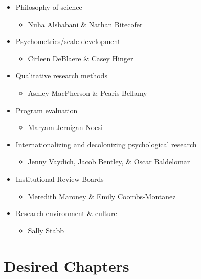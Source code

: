 \documentclass[
  11pt,
]{book}
\providecommand{\tightlist}{%
  \setlength{\itemsep}{0pt}\setlength{\parskip}{0pt}}
\begin{document}
\begin{itemize}
\tightlist
\item
  Philosophy of science

  \begin{itemize}
  \tightlist
  \item
    Nuha Alshabani \& Nathan Bitecofer
  \end{itemize}
\item
  Psychometrics/scale development

  \begin{itemize}
  \tightlist
  \item
    Cirleen DeBlaere \& Casey Hinger
  \end{itemize}
\item
  Qualitative research methods

  \begin{itemize}
  \tightlist
  \item
    Ashley MacPherson \& Pearis Bellamy
  \end{itemize}
\item
  Program evaluation

  \begin{itemize}
  \tightlist
  \item
    Maryam Jernigan-Noesi
  \end{itemize}
\item
  Internationalizing and decolonizing psychological research

  \begin{itemize}
  \tightlist
  \item
    Jenny Vaydich, Jacob Bentley, \& Oscar Baldelomar
  \end{itemize}
\item
  Institutional Review Boards

  \begin{itemize}
  \tightlist
  \item
    Meredith Maroney \& Emily Coombs-Montanez
  \end{itemize}
\item
  Research environment \& culture

  \begin{itemize}
  \tightlist
  \item
    Sally Stabb
  \end{itemize}
\end{itemize}

\section{Desired Chapters}\label{desired-chapters}
\end{document}
